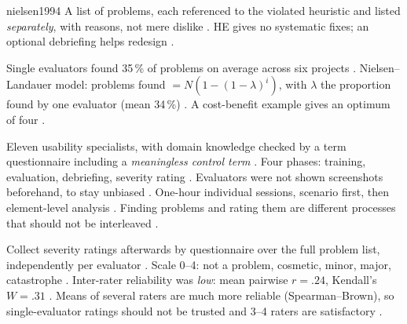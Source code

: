 \begin{papercard}{nielsen1994}
 A list of problems, each referenced to the violated heuristic and listed \emph{separately}, with reasons, not mere dislike . HE gives no systematic fixes; an optional debriefing helps redesign .

 Single evaluators found 35\,\% of problems on average across six projects . Nielsen--Landauer model: problems found $=N(1-(1-\lambda)^i)$, with $\lambda$ the proportion found by one evaluator (mean 34\,\%) . A cost-benefit example gives an optimum of four .

 Eleven usability specialists, with domain knowledge checked by a term questionnaire including a \emph{meaningless control term} . Four phases: training, evaluation, debriefing, severity rating . Evaluators were not shown screenshots beforehand, to stay unbiased . One-hour individual sessions, scenario first, then element-level analysis . Finding problems and rating them are different processes that should not be interleaved .

 Collect severity ratings afterwards by questionnaire over the full problem list, independently per evaluator . Scale 0--4: not a problem, cosmetic, minor, major, catastrophe . Inter-rater reliability was \emph{low}: mean pairwise $r=.24$, Kendall's $W=.31$ . Means of several raters are much more reliable (Spearman--Brown), so single-evaluator ratings should not be trusted and 3--4 raters are satisfactory .


\end{papercard}
